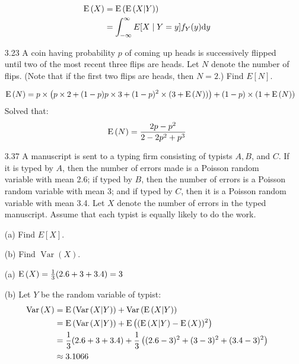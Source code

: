 \documentclass[en,hazy,blue,12pt,device = normal]{elegantnote}
\begin{document}
\begin{enumerate}
    \begin{tcolorbox}
        \sol
        \begin{align*}
            \operatorname E\left(X\right) &= \operatorname E\left(\operatorname E\left(X|Y\right)\right)\\
            &=\int_{-\infty}^{\infty} E[X \mid Y=y] f_Y(y) \text{d} y
        \end{align*}
    \end{tcolorbox}

    \item[3.23]A coin having probability $p$ of coming up heads is successively flipped until two of the most recent three flips are heads. Let $N$ denote the number of flips. (Note that if the first two flips are heads, then $N=2$.) Find $E[N]$.
    \begin{tcolorbox}
        \sol
        \begin{align*}
            \operatorname E\left(N\right) &= p\times\left(p \times 2 + (1-p) p\times 3 + (1-p)^2 \times (3+\operatorname E\left(N\right)) \right) + (1-p) \times (1+\operatorname E\left(N\right))
        \end{align*}
        Solved that:
        \[\operatorname E\left(N\right) = \frac{2p-p^2}{2-2p^2+p^3}\]
    \end{tcolorbox}

    \item[3.37]A manuscript is sent to a typing firm consisting of typists $A, B$, and $C$. If it is typed by $A$, then the number of errors made is a Poisson random variable with mean 2.6; if typed by $B$, then the number of errors is a Poisson random variable with mean 3; and if typed by $C$, then it is a Poisson random variable with mean 3.4. Let $X$ denote the number of errors in the typed manuscript. Assume that each typist is equally likely to do the work.
    
    (a) Find $E[X]$.

    (b) Find $\operatorname{Var}(X)$.

    \begin{tcolorbox}
        \sol

        (a) \(\operatorname E\left(X\right) = \frac 1 3 (2.6+3+3.4) = 3\)

        (b) Let \(Y\) be the random variable of typist:
        \begin{align*}
            \operatorname{Var}\left(X\right) &= \operatorname E\left(\operatorname{Var}\left(X|Y\right)\right) + \operatorname{Var}\left(\operatorname E\left(X|Y\right)\right)\\
            &= \operatorname E\left(\operatorname{Var}\left(X|Y\right)\right)+ \operatorname E\left((\operatorname E\left(X|Y\right) - \operatorname E\left(X\right))^2\right)\\
            &= \frac 1 3 (2.6+3+3.4) + \frac 1 3 \left((2.6-3)^2+ (3-3)^2 + (3.4-3)^2\right)\\
            &\approx 3.1066
        \end{align*}
    \end{tcolorbox}


\end{enumerate}
\end{document}
